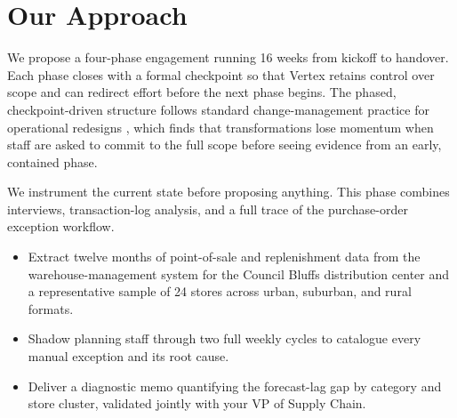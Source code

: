 \section{Our Approach}

We propose a four-phase engagement running 16 weeks from kickoff to
handover. Each phase closes with a formal checkpoint so that Vertex retains
control over scope and can redirect effort before the next phase begins. The
phased, checkpoint-driven structure follows standard change-management
practice for operational redesigns \cite{kotter2012leading}, which finds that
transformations lose momentum when staff are asked to commit to the full
scope before seeing evidence from an early, contained phase.

\begin{center}
\end{center}

\vspace{0.3cm}

\vspace{0.3cm}

We instrument the current state before proposing anything. This phase
combines interviews, transaction-log analysis, and a full trace of the
purchase-order exception workflow.

\begin{itemize}[leftmargin=1.4em]
  \item Extract twelve months of point-of-sale and replenishment data from the
    warehouse-management system for the Council Bluffs distribution center and
    a representative sample of 24 stores across urban, suburban, and rural
    formats.
  \item Shadow planning staff through two full weekly cycles to catalogue
    every manual exception and its root cause.
  \item Deliver a diagnostic memo quantifying the forecast-lag gap by category
    and store cluster, validated jointly with your VP of Supply Chain.
  \end{itemize}

